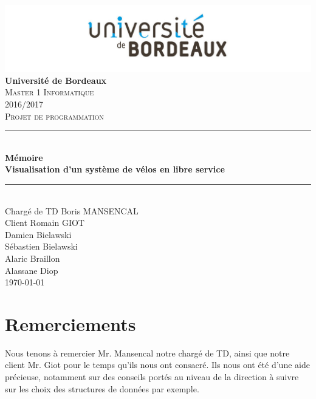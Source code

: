 \documentclass[12pt]{article}
\begin{document}
	\begin{titlepage}
		\includegraphics[scale=0.2]{logo_bordeaux.png}\\
		\centering
		\linebreak
		{\LARGE \bfseries Université de Bordeaux}\\ [2cm]
		\textsc{\Large Master 1 Informatique}\\ [0,3cm]
		\textsc{\Large 2016/2017}\\ [1,4cm]

		\textsc{\Large Projet de programmation}\\ [1.4cm]

		\rule{16cm}{1mm}\\ [0,7cm]
		{\huge \bfseries Mémoire}\\ [0,5cm]
		{\huge \bfseries Visualisation d'un système de vélos en libre service} \\[0,7cm]
		\rule{16cm}{1mm}\\ [1cm]

		{\Large Chargé de TD Boris MANSENCAL }\\ [0,3cm]
		{\Large Client Romain GIOT }\\ [1cm]

		{\Large Damien Bielawski }\\ [0,3cm]
		{\Large Sébastien Bielawski }\\[0,3cm]
		{\Large Alaric Braillon }\\ [0,3cm]
		{\Large Alassane Diop }\\ [2cm]
		\Large\today

	\end{titlepage}

\newpage
\section*{Remerciements} 
	Nous tenons à remercier Mr. Mansencal notre chargé de TD, ainsi que notre client Mr. Giot
	pour le temps qu'ils nous ont consacré. Ils nous ont été d'une aide précieuse, notamment
	sur des conseils portés au niveau de la direction à suivre sur les choix des structures de
	données	par exemple.	
	
\newpage
\tableofcontents
	
\end{document}
